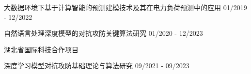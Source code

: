 
\begin{cventries}
    \vspace{-6.0mm}

    {
        \begin{cvitems}
            \item {
                \cvsubfunding
                {大数据环境下基于计算智能的预测建模技术及其在电力负荷预测中的应用}
                {01/2019 - 12/2022}
            }
            \item {
                \cvsubfunding
                {自然语言处理深度模型的对抗攻防关键算法研究}
                {01/2020 - 12/2023}
            }
        \end{cvitems}
    }

    \cvfunding
    {湖北省国际科技合作项目}
    {\begin{cvitems}
            \item {
                        \cvsubfunding
                        {深度学习模型对抗攻防基础理论与算法研究}
                        {09/2021 - 09/2023}
                  }
        \end{cvitems}
    }

\end{cventries}

\vspace{3.0mm}